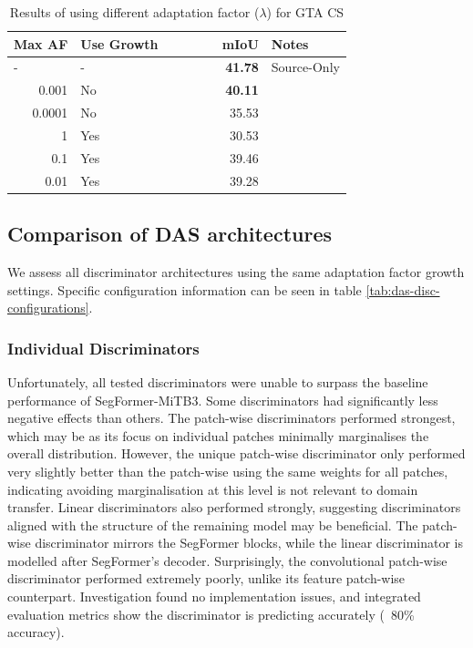 \documentclass[a4paper,12pt]{report}
\begin{document}
\begin{table}[]
    \centering
    \begin{tabular}{|r|l|r|l|}
        \hline
        \multicolumn{1}{|l|}{Max AF} & Use Growth & \multicolumn{1}{l|}{\ \ \ \ \ \ \ mIoU} & Notes       \\ \hline
        \multicolumn{1}{|l|}{-}      & -          & \textbf{41.78}                          & Source-Only \\ \hline
        0.001                        & No         & \textbf{40.11}                          &             \\ \hline
        0.0001                       & No         & 35.53                                   &             \\ \hline
        1                            & Yes        & 30.53                                   &             \\ \hline
        0.1                          & Yes        & 39.46                                   &             \\ \hline
        0.01                         & Yes        & 39.28                                   &             \\ \hline
    \end{tabular}
    \caption{Results of using different adaptation factor ($\lambda$) for GTA \textrightarrow CS}
\end{table}

\subsection{Comparison of DAS architectures}

We assess all discriminator architectures using the same adaptation factor growth settings. Specific configuration information can be seen in table \ref{tab:das-disc-configurations}.

\subsubsection{Individual Discriminators}
Unfortunately, all tested discriminators were unable to surpass the baseline performance of SegFormer-MiTB3. Some discriminators had significantly less negative effects than others. The patch-wise discriminators performed strongest, which may be as its focus on individual patches minimally marginalises the overall distribution. However, the unique patch-wise discriminator only performed very slightly better than the patch-wise using the same weights for all patches, indicating avoiding marginalisation at this level is not relevant to domain transfer. Linear discriminators also performed strongly, suggesting discriminators aligned with the structure of the remaining model may be beneficial. The patch-wise discriminator mirrors the SegFormer blocks, while the linear discriminator is modelled after SegFormer's decoder. Surprisingly, the convolutional patch-wise discriminator performed extremely poorly, unlike its feature patch-wise counterpart. Investigation found no implementation issues, and integrated evaluation metrics show the discriminator is predicting accurately (~80\% accuracy).
\end{document}
